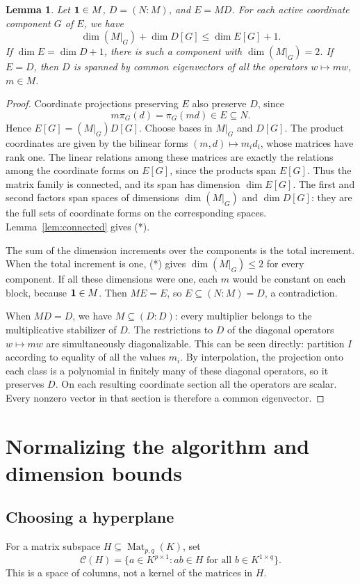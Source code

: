 \documentclass[11pt,a4paper]{article}
\numberwithin{equation}{section}
\theoremstyle{plain}
\newtheorem{lemma}[theorem]{Lemma}
\theoremstyle{definition}
\DeclareMathOperator{\Mat}{Mat}\DeclareMathOperator{\Span}{span}
\newcommand{\col}{\mathcal C}\newcommand{\test}{\mathcal T}
\newcommand{\leqs}{\leqslant}\newcommand{\geqs}{\geqslant}
\begin{document}
\begin{lemma}\label{lem:component-cost}
Let $\mathbf1\in M$, $D=(N:M)$, and $E=MD$. For each active coordinate
component $G$ of $E$, we have
\[
 \dim(M|_G)+\dim D[G]\leqs\dim E[G]+1.                 \tag{*}
\]
If $\dim E=\dim D+1$, there is such a component with $\dim(M|_G)=2$.
If $E=D$, then $D$ is spanned by common eigenvectors of all the
operators $w\mapsto mw$, $m\in M$.
\end{lemma}
\begin{proof}
Coordinate projections preserving $E$ also preserve $D$, since
\[
 m\pi_G(d)=\pi_G(md)\in E\subseteq N.
\]
Hence
$E[G]=(M|_G)D[G]$. Choose bases in $M|_G$ and $D[G]$.
The product coordinates are given by the bilinear forms
$(m,d)\mapsto m_i d_i$, whose matrices have rank one.
The linear relations among these matrices are exactly the relations
among the coordinate forms on $E[G]$, since the products span $E[G]$.
Thus the matrix family is connected, and its span has dimension
$\dim E[G]$. The first and second factors span spaces of dimensions
$\dim(M|_G)$ and $\dim D[G]$: they are the full sets of coordinate
forms on the corresponding spaces. Lemma~\ref{lem:connected} gives (*).

The sum of the dimension increments over the components is the total
increment. When the total increment is one, (*) gives
$\dim(M|_G)\leqs2$ for every component. If all these dimensions were one,
each $m$ would be constant on each block, because $\mathbf1\in M$.
Then $ME=E$, so $E\subseteq(N:M)=D$, a contradiction.

When $MD=D$, we have $M\subseteq(D:D)$: every multiplier belongs to
the multiplicative stabilizer of $D$.
The restrictions to $D$ of the diagonal operators $w\mapsto mw$ are
simultaneously diagonalizable. This can be seen directly: partition
$I$ according to equality of all the values $m_i$. By interpolation,
the projection onto each class is a polynomial in finitely many of
these diagonal operators, so it preserves $D$. On each resulting
coordinate section all the operators are scalar. Every nonzero vector
in that section is therefore a common eigenvector.
\end{proof}

\section{Normalizing the algorithm and dimension bounds}

\subsection{Choosing a hyperplane}
For a matrix subspace $H\subseteq\Mat_{p,q}(K)$, set
\[
 \col(H)=\{a\in K^{p\times1}:ab\in H
                 \text{ for all }b\in K^{1\times q}\}.
\]
This is a space of columns, not a kernel of the matrices in $H$.
\end{document}
